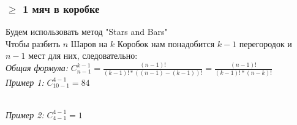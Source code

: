 \documentclass{article}
\begin{document}
            \subsubsection{$\ge$ 1 мяч в коробке}
                Будем использовать метод "Stars and Bars"\\
                Чтобы разбить $n$ Шаров на $k$ Коробок нам понадобится $k-1$ перегородок и $n-1$ мест для них, следовательно:\\
                \textit{Общая формула:} $ C^{k-1}_{n-1} = \frac{(n-1)!}{(k-1)!*((n-1)-(k-1))!} = \frac{(n-1)!}{(k-1)!*(n-k)!} $\\
                \textit{Пример 1:} $ C^{4-1}_{10-1} = 84 $
                \begin{figure}[h!]
                \end{figure}\\
                \textit{Пример 2:} $ C^{4-1}_{4-1} = 1 $
                \begin{figure}[h!]
                \end{figure}
\end{document}
